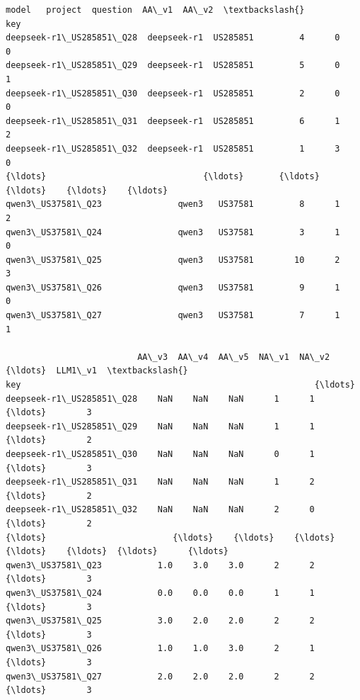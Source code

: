 \documentclass[11pt]{article}
\makeatletter
\newcommand{\boxspacing}{\kern\kvtcb@left@rule\kern\kvtcb@boxsep}
\newcommand{\prompt}[4]{
        {\ttfamily\llap{{\color{#2}[#3]:\hspace{3pt}#4}}\vspace{-\baselineskip}}
    }
\makeatother
\begin{document}
            \begin{tcolorbox}[breakable, size=fbox, boxrule=.5pt, pad at break*=1mm, opacityfill=0]
\prompt{Out}{outcolor}{44}{\boxspacing}
\begin{Verbatim}[commandchars=\\\{\}]
                                model   project  question  AA\_v1  AA\_v2  \textbackslash{}
key
deepseek-r1\_US285851\_Q28  deepseek-r1  US285851         4      0      0
deepseek-r1\_US285851\_Q29  deepseek-r1  US285851         5      0      1
deepseek-r1\_US285851\_Q30  deepseek-r1  US285851         2      0      0
deepseek-r1\_US285851\_Q31  deepseek-r1  US285851         6      1      2
deepseek-r1\_US285851\_Q32  deepseek-r1  US285851         1      3      0
{\ldots}                               {\ldots}       {\ldots}       {\ldots}    {\ldots}    {\ldots}
qwen3\_US37581\_Q23               qwen3   US37581         8      1      2
qwen3\_US37581\_Q24               qwen3   US37581         3      1      0
qwen3\_US37581\_Q25               qwen3   US37581        10      2      3
qwen3\_US37581\_Q26               qwen3   US37581         9      1      0
qwen3\_US37581\_Q27               qwen3   US37581         7      1      1

                          AA\_v3  AA\_v4  AA\_v5  NA\_v1  NA\_v2  {\ldots}  LLM1\_v1  \textbackslash{}
key                                                          {\ldots}
deepseek-r1\_US285851\_Q28    NaN    NaN    NaN      1      1  {\ldots}        3
deepseek-r1\_US285851\_Q29    NaN    NaN    NaN      1      1  {\ldots}        2
deepseek-r1\_US285851\_Q30    NaN    NaN    NaN      0      1  {\ldots}        3
deepseek-r1\_US285851\_Q31    NaN    NaN    NaN      1      2  {\ldots}        2
deepseek-r1\_US285851\_Q32    NaN    NaN    NaN      2      0  {\ldots}        2
{\ldots}                         {\ldots}    {\ldots}    {\ldots}    {\ldots}    {\ldots}  {\ldots}      {\ldots}
qwen3\_US37581\_Q23           1.0    3.0    3.0      2      2  {\ldots}        3
qwen3\_US37581\_Q24           0.0    0.0    0.0      1      1  {\ldots}        3
qwen3\_US37581\_Q25           3.0    2.0    2.0      2      2  {\ldots}        3
qwen3\_US37581\_Q26           1.0    1.0    3.0      2      1  {\ldots}        3
qwen3\_US37581\_Q27           2.0    2.0    2.0      2      2  {\ldots}        3


\end{Verbatim}
\end{tcolorbox}
\end{document}
